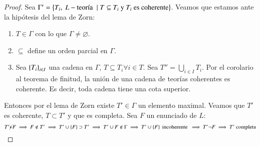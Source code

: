 \begin{proof}
    Sea $\Gamma' = \sdf{T_i,\ L-\text{teoría } \mid T \subseteq T_i \text{ y } T_i \text{ es coherente}}$. Veamos que estamos ante la hipótesis del lema de Zorn:
    \begin{enumerate}
        \item $T \in\Gamma$ con lo que $\Gamma \neq \varnothing$.
        \item $\subseteq$ define un orden parcial en $\Gamma$.
        \item Sea $\left\{T_i\right\}_{i\in I}$ una cadena en $\Gamma$, $T \subseteq T_i \forall i \in T$. Sea $T'' = \bigcup_{i\in I} T_i$. Por el corolario al teorema de finitud, la unión de una cadena de teorías coherentes es coherente. Es decir, toda cadena tiene una cota superior.
    \end{enumerate}
    Entonces por el lema de Zorn existe $T' \in \Gamma$ un elemento maximal. Veamos que $T'$ es coherente, $T \subset T'$ y que es completa. Sea $F$ un enunciado de $L$:
    $$
        T' \cancel\vdash F \implies F \notin T' \implies T' \cup \left\{F\right\} \supset T' \implies T' \cup{F}\notin \Gamma \implies T' \cup \left\{F\right\} \text{ incoherente } \implies T' \neg F \implies T'\text{ completa}
    $$
\end{proof}
